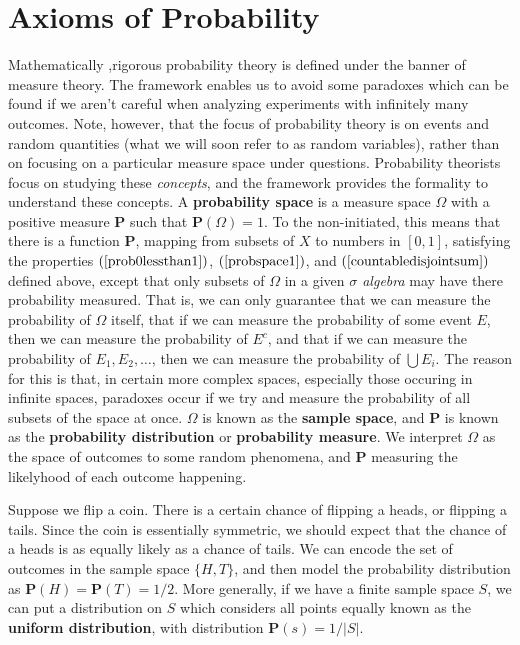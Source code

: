 \section{Axioms of Probability}

Mathematically ,rigorous probability theory is defined under the banner of measure theory. The framework enables us to avoid some paradoxes which can be found if we aren't careful when analyzing experiments with infinitely many outcomes. Note, however, that the focus of probability theory is on events and random quantities (what we will soon refer to as random variables), rather than on focusing on a particular measure space under questions. Probability theorists focus on studying these {\it concepts}, and the framework provides the formality to understand these concepts. A {\bf probability space} is a measure space $\Omega$ with a positive measure $\mathbf{P}$ such that $\mathbf{P}(\Omega) = 1$. To the non-initiated, this means that there is a function $\mathbf{P}$, mapping from subsets of $X$ to numbers in $[0,1]$, satisfying the properties $(\ref{prob0lessthan1})$, $(\ref{probspace1})$, and $(\ref{countabledisjointsum})$ defined above, except that only subsets of $\Omega$ in a given {\it $\sigma$ algebra} may have there probability measured. That is, we can only guarantee that we can measure the probability of $\Omega$ itself, that if we can measure the probability of some event $E$, then we can measure the probability of $E^c$, and that if we can measure the probability of $E_1, E_2, \dots$, then we can measure the probability of $\bigcup E_i$. The reason for this is that, in certain more complex spaces, especially those occuring in infinite spaces, paradoxes occur if we try and measure the probability of all subsets of the space at once. $\Omega$ is known as the {\bf sample space}, and $\mathbf{P}$ is known as the {\bf probability distribution} or {\bf probability measure}. We interpret $\Omega$ as the space of outcomes to some random phenomena, and $\mathbf{P}$ measuring the likelyhood of each outcome happening.

\begin{example}
    Suppose we flip a coin. There is a certain chance of flipping a heads, or flipping a tails. Since the coin is essentially symmetric, we should expect that the chance of a heads is as equally likely as a chance of tails. We can encode the set of outcomes in the sample space $\{ H, T \}$, and then model the probability distribution as $\mathbf{P}(H) = \mathbf{P}(T) = 1/2$. More generally, if we have a finite sample space $S$, we can put a distribution on $S$ which considers all points equally known as the {\bf uniform distribution}, with distribution $\mathbf{P}(s) = 1/|S|$.
\end{example}

